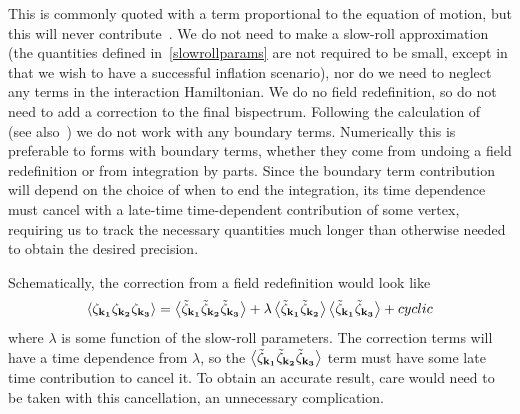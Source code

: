 \documentclass[a4paper,12pt]{extarticle}
\begin{document}
This is commonly quoted with a term proportional to the equation of motion,
but this will never contribute~\cite{px_burrage,bdy_arroja,bdy_passaglia,bdy_rigopoulos}.
We do not need to make a slow-roll approximation
(the quantities defined in~\eqref{slowrollparams} are not required to be small,
except in that we wish to have a successful inflation scenario),
nor do we need to neglect any terms in the interaction Hamiltonian.
We do no field redefinition,
so do not need to add a correction to the final bispectrum.
Following the calculation of~\cite{px_burrage} (see also~\cite{bdy_arroja,bdy_passaglia,bdy_rigopoulos})
we do not work with any boundary terms.
Numerically this is preferable to forms with boundary terms,
whether they come from undoing a field redefinition or from integration by parts.
Since the boundary term contribution will depend on the choice of when to end the integration,
its time dependence must cancel with a late-time time-dependent
contribution of some vertex, requiring us to track the necessary quantities
much longer than otherwise needed to obtain the desired precision.

Schematically, the correction from a field redefinition would look like
\begin{align}
{
\left< \zeta_{\bf{k_1}}\zeta_{\bf{k_2}}\zeta_{\bf{k_3}} \right>
    = \left< \tilde{\zeta}_{\bf{k_1}}\tilde{\zeta}_{\bf{k_2}}\tilde{\zeta}_{\bf{k_3}} \right>
    + \lambda \left< \tilde{\zeta}_{\bf{k_1}}\tilde{\zeta}_{\bf{k_2}} \right>\left< \tilde{\zeta}_{\bf{k_1}}\tilde{\zeta}_{\bf{k_3}} \right>
    + cyclic
}
\end{align}
where $\lambda$ is some function of the slow-roll parameters.
The correction terms will have a time dependence from $\lambda$,
so the $\left< \tilde{\zeta}_{\bf{k_1}}\tilde{\zeta}_{\bf{k_2}}\tilde{\zeta}_{\bf{k_3}} \right>$
term must have some late time contribution to cancel it.
To obtain an accurate result, care would need to be taken with this cancellation,
an unnecessary complication.
\end{document}
